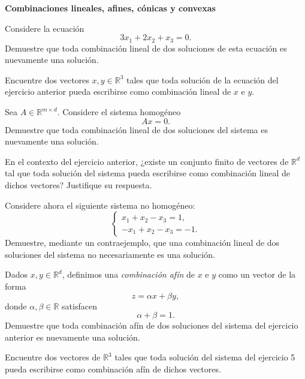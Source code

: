 \documentclass[a4paper,12pt]{article}
\begin{document}

\noindent\textbf{Combinaciones lineales, afines, cónicas y convexas}

\begin{exerciselist}

    \item Considere la ecuación
    \[
        3x_1 + 2x_2 + x_3 = 0.
    \]
    Demuestre que toda combinación lineal de dos soluciones de esta ecuación es nuevamente una solución.

    \item Encuentre dos vectores \(x,y \in \mathbb{R}^3\) tales que toda solución de la ecuación del ejercicio anterior pueda escribirse como combinación lineal de \(x\) e \(y\).

    \item Sea \(A \in \mathbb{R}^{m \times d}\). Considere el sistema homogéneo
    \[
        Ax = 0.
    \]
    Demuestre que toda combinación lineal de dos soluciones del sistema es nuevamente una solución.

    \item En el contexto del ejercicio anterior, ¿existe un conjunto finito de vectores de \(\mathbb{R}^d\) tal que toda solución del sistema pueda escribirse como combinación lineal de dichos vectores? Justifique su respuesta.

    \item Considere ahora el siguiente sistema no homogéneo:
    \[
    \begin{cases}
        x_1 + x_2 - x_3 = 1, \\
        -x_1 + x_2 - x_3 = -1.
    \end{cases}
    \]
    Demuestre, mediante un contraejemplo, que una combinación lineal de dos soluciones del sistema no necesariamente es una solución.

    \item Dados \(x,y \in \mathbb{R}^d\), definimos una \emph{combinación afín} de \(x\) e \(y\) como un vector de la forma
    \[
        z = \alpha x + \beta y,
    \]
    donde \(\alpha,\beta \in \mathbb{R}\) satisfacen
    \[
        \alpha + \beta = 1.
    \]
    Demuestre que toda combinación afín de dos soluciones del sistema del ejercicio anterior es nuevamente una solución.

    \item Encuentre dos vectores de \(\mathbb{R}^3\) tales que toda solución del sistema del ejercicio 5 pueda escribirse como combinación afín de dichos vectores.


\end{exerciselist}
\end{document}
